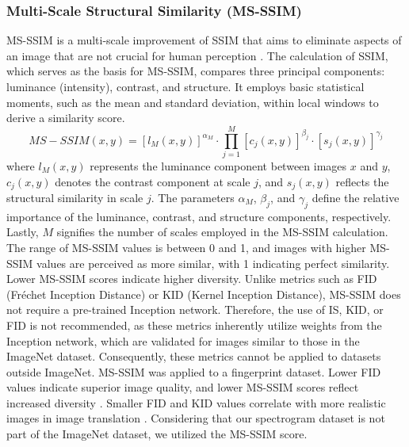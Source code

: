 \documentclass[journal]{IEEEtran}
\begin{document}
\subsubsection{Multi-Scale Structural Similarity (MS-SSIM)}
MS-SSIM is a multi-scale improvement of SSIM that aims to eliminate aspects of an image that are not crucial for human perception \cite{wang2003multiscale,ma2016group}. The calculation of SSIM, which serves as the basis for MS-SSIM, compares three principal components: luminance (intensity), contrast, and structure. It employs basic statistical moments, such as the mean and standard deviation, within local windows to derive a similarity score.
$$MS-SSIM(x,y)=\left[l_M (x,y)\right]^{\alpha_M}\cdot \prod_{j=1}^{M}\left[c_j(x,y)\right]^{\beta_j}\cdot \left[s_j (x,y)\right]^{\gamma_j}$$
where $l_M (x,y)$ represents the luminance component between images $x$ and $y$, $c_j(x,y)$ denotes the contrast component at scale $j$, and $s_j(x,y)$ reflects the structural similarity in scale $j$. The parameters $\alpha_M$, $\beta_j$, and $\gamma_j$ define the relative importance of the luminance, contrast, and structure components, respectively. Lastly, $M$ signifies the number of scales employed in the MS-SSIM calculation\cite{arsenio2025recovering}.
The range of MS-SSIM values is between 0 and 1, and images with higher MS-SSIM values are perceived as more similar\cite{odena2017conditional}, with 1 indicating perfect similarity. Lower MS-SSIM scores indicate higher diversity\cite{guo2019autoembedding,wang2019improvingmmdgantrainingrepulsive}.
Unlike metrics such as FID (Fréchet Inception Distance) or KID (Kernel Inception Distance), MS-SSIM does not require a pre-trained Inception network\cite{fahim2020alightweight}. Therefore, the use of IS, KID, or FID is not recommended, as these metrics inherently utilize weights from the Inception network, which are validated for images similar to those in the ImageNet dataset. Consequently, these metrics cannot be applied to datasets outside ImageNet. MS-SSIM  was applied to a fingerprint dataset\cite{fahim2020alightweight}.
Lower FID values indicate superior image quality, and lower MS-SSIM scores reflect increased diversity \cite{guo2019autoembedding}. Smaller FID and KID values correlate with more realistic images in image translation \cite{torbunov2023rethinking}.
Considering that our spectrogram dataset is not part of the ImageNet dataset, we utilized the MS-SSIM score.
\end{document}
